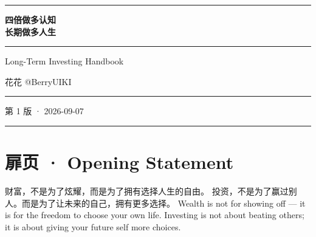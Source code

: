\documentclass[a4paper,11pt,oneside,fontset=none,UTF8,zihao=-4]{ctexbook}
\title{\mytitle}
\author{花花 \textbar{} @BerryUIKI}
\date{2026-09-07}
\begin{document}
\begin{titlepage}
\thispagestyle{empty}
\centering
\vspace*{3.5cm}

{\color{dh-blossom}\rule{0.55\textwidth}{2pt}\par}
\vspace{2.2cm}

{\fontsize{34pt}{48pt}\selectfont\bfseries\color{dh-navy}%
四倍做多认知\\[0.35em]%
长期做多人生\par}

\vspace{0.6cm}

{\color{dh-gold}\rule{0.25\textwidth}{1.2pt}\par}
\vspace{0.4cm}

{\Large\color{dh-navy!85}Long-Term Investing Handbook\par}
\vspace{1.5cm}

{\large\color{dh-bronze}花花 \textbar{} @BerryUIKI\par}
\vspace{1.2cm}

{\color{dh-blossom}\rule{0.35\textwidth}{1pt}\par}
\vfill

{\large\color{dh-navy}第 1 版 · 2026-09-07\par}
\vspace{0.4cm}
{\color{dh-gold}\rule{0.55\textwidth}{1pt}\par}
\vspace{2cm}
\end{titlepage}

\frontmatter

\tableofcontents

\newpage

\chapter{扉页 · Opening Statement}\label{ux6249ux9875-opening-statement}

\begin{dhquote}
财富，不是为了炫耀，而是为了拥有选择人生的自由。
投资，不是为了赢过别人。而是为了让未来的自己，拥有更多选择。 Wealth is
not for showing off --- it is for the freedom to choose your own life.
Investing is not about beating others; it is about giving your future
self more choices.
\end{dhquote}
\end{document}
